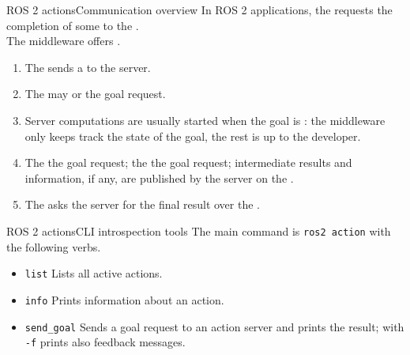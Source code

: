 \begin{frame}{ROS 2 actions}{Communication overview}
  \justifying
  In ROS 2 applications, the  requests the completion of some  to the .\\
  The middleware offers .
  \medskip
  \begin{enumerate}
    \item The  sends a  to the server.
    \item The  may  or  the goal request.
    \item Server computations are usually started when the goal is : the middleware only keeps track the state of the goal, the rest is up to the developer.
    \item The  the goal request; the  the goal request; intermediate results and information, if any, are published by the server on the .
    \item The  asks the server for the final result over the .
  \end{enumerate}
\end{frame}
\begin{frame}{ROS 2 actions}{CLI introspection tools}
  \justifying
  The main command is \texttt{ros2 action} with the following verbs.
  \begin{itemize}
    \item \texttt{list} Lists all active actions.
    \item \texttt{info} Prints information about an action.
    \item \texttt{send\_goal} Sends a goal request to an action server and prints the result; with \texttt{-f} prints also feedback messages.
  \end{itemize}
\end{frame}
